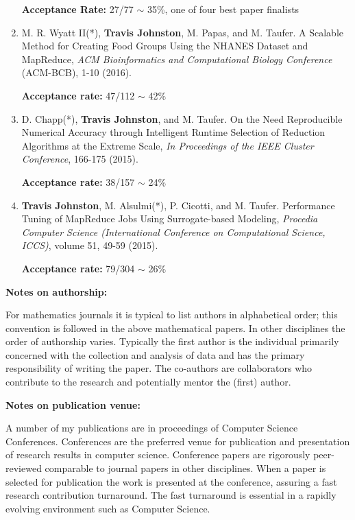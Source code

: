 \documentclass{article}
\begin{document}
\begin{enumerate}[1.]
		\textbf{Acceptance Rate: } 27/77 $\sim$ 35\%, one of four best paper finalists

		
		\item M. R. Wyatt II(*), \textbf{Travis Johnston}, M. Papas, and M. Taufer. A Scalable Method for Creating Food Groups Using the NHANES Dataset and MapReduce,
		\textit{ACM Bioinformatics and Computational Biology Conference} (ACM-BCB), 1-10 (2016).

		\textbf{Acceptance rate:} 47/112 $\sim$ 42\%

		
		\item D. Chapp(*), \textbf{Travis Johnston}, and M. Taufer. On the Need Reproducible Numerical Accuracy through Intelligent Runtime Selection of Reduction Algorithms at the Extreme Scale,
		\textit{In Proceedings of the IEEE Cluster Conference}, 166-175 (2015).

		\textbf{Acceptance rate: } 38/157 $\sim$ 24\%


		\item \textbf{Travis Johnston}, M. Alsulmi(*), P. Cicotti, and M. Taufer. Performance Tuning of MapReduce Jobs Using Surrogate-based Modeling, 
		\textit{Procedia Computer Science (International Conference on Computational Science, ICCS)}, volume 51, 49-59 (2015).

		\textbf{Acceptance rate: } 79/304 $\sim$ 26\%

	\end{enumerate}

\medskip

\noindent \textbf{Notes on authorship: }

\noindent For mathematics journals it is typical to list authors in alphabetical order; this convention is followed in the above mathematical papers.
In other disciplines the order of authorship varies.  
Typically the first author is the individual primarily concerned with the collection and analysis of data and has the primary responsibility of writing the paper.
The co-authors are collaborators who contribute to the research and potentially mentor the (first) author.

\medskip

\noindent \textbf{Notes on publication venue: }

\noindent A number of my publications are in proceedings of Computer Science Conferences.
Conferences are the preferred venue for publication and presentation of research results in computer science.
Conference papers are rigorously peer-reviewed comparable to journal papers in other disciplines.
When a paper is selected for publication the work is presented at the conference, assuring a fast research contribution turnaround.
The fast turnaround is essential in a rapidly evolving environment such as Computer Science.
\end{document}
